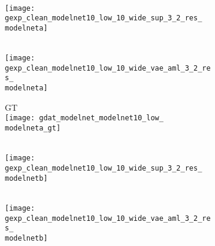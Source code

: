 \newcommand{\modelneta}{15318} %
\newcommand{\modelnetb}{2664}
\newcommand{\modelnetc}{9324} %
\newcommand{\modelnetd}{18648} %
\newcommand{\modelnete}{9990}
\newcommand{\modelnetf}{5994}
\newcommand{\modelnetg}{12654}
\newcommand{\modelneth}{11988}
\newcommand{\modelneti}{7326}
\begin{figure}[t!]
    \vspace*{-\figskipabove px}
    \vspace*{2px}
    \centering
    {\scriptsize
    
    \begin{subfigure}[t]{0.07\textwidth}
        \vspace{0px}\centering
        \Dai\\
        \texttt{[image: gexp\_clean\_modelnet10\_low\_10\_wide\_sup\_3\_2\_res\_\\modelneta]}
    \end{subfigure}
    \begin{subfigure}[t]{0.07\textwidth}
        \vspace{0px}\centering
        \AML\\
        \texttt{[image: gexp\_clean\_modelnet10\_low\_10\_wide\_vae\_aml\_3\_2\_res\_\\modelneta]}
    \end{subfigure}
    \begin{subfigure}[t]{0.07\textwidth}
        \vspace{0px}\centering
        GT\\
        \texttt{[image: gdat\_modelnet\_modelnet10\_low\_\\modelneta\_gt]}
    \end{subfigure}
    \begin{subfigure}[t]{0.07\textwidth}
        \vspace{0px}\centering
        \Dai\\
        \texttt{[image: gexp\_clean\_modelnet10\_low\_10\_wide\_sup\_3\_2\_res\_\\modelnetb]}
    \end{subfigure}
    \begin{subfigure}[t]{0.07\textwidth}
        \vspace{0px}\centering
        \AML\\
        \texttt{[image: gexp\_clean\_modelnet10\_low\_10\_wide\_vae\_aml\_3\_2\_res\_\\modelnetb]}

\end{subfigure}}
\end{figure}
